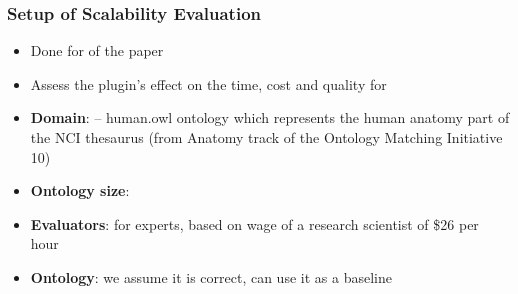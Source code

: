 \documentclass{beamer}
\begin{document}
%
%


\begin{frame}
  \frametitle{Setup of Scalability Evaluation}
  \begin{itemize}
        \item Done for  of the paper
    \vspace{0.1cm}
        \item Assess the plugin's effect on the time, cost and quality for 
    \vspace{0.2cm}
        \item \textbf{Domain}:  -- human.owl ontology which represents the human anatomy part of the NCI thesaurus (from Anatomy track of the Ontology Matching Initiative 10)
        \item \textbf{Ontology size}: 
        \item \textbf{Evaluators}:  for experts, based on wage of a research scientist of \$26 per hour
        \item \textbf{Ontology}: we assume it is correct, can use it as a baseline
  \end{itemize}
\end{frame}
\end{document}
